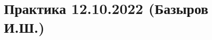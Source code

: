\documentclass[main.tex]{subfiles}
\begin{document}

\section{Практика 12.10.2022 (Базыров И.Ш.)}
\end{document}
